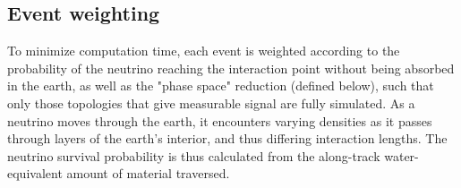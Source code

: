 

\subsection{Event weighting}
\label{sec:weights}
To minimize computation time,
each event is weighted according to the probability of the neutrino reaching the interaction point without being absorbed in the earth, as well as
the "phase space" reduction (defined below), such that only those topologies that give measurable signal are fully simulated. 
As a neutrino moves through the earth, it encounters varying
densities as it passes through layers of the earth's interior,
and thus differing interaction lengths. 
The neutrino survival probability is thus calculated from the along-track
water-equivalent amount of material traversed.

